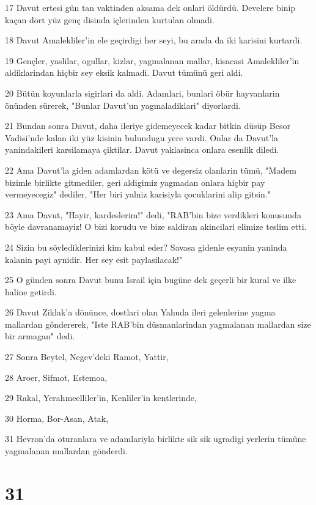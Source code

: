 \par 17 Davut ertesi gün tan vaktinden aksama dek onlari öldürdü. Develere binip kaçan dört yüz genç disinda içlerinden kurtulan olmadi.
\par 18 Davut Amalekliler'in ele geçirdigi her seyi, bu arada da iki karisini kurtardi.
\par 19 Gençler, yaslilar, ogullar, kizlar, yagmalanan mallar, kisacasi Amalekliler'in aldiklarindan hiçbir sey eksik kalmadi. Davut tümünü geri aldi.
\par 20 Bütün koyunlarla sigirlari da aldi. Adamlari, bunlari öbür hayvanlarin önünden sürerek, "Bunlar Davut'un yagmaladiklari" diyorlardi.
\par 21 Bundan sonra Davut, daha ileriye gidemeyecek kadar bitkin düsüp Besor Vadisi'nde kalan iki yüz kisinin bulundugu yere vardi. Onlar da Davut'la yanindakileri karsilamaya çiktilar. Davut yaklasinca onlara esenlik diledi.
\par 22 Ama Davut'la giden adamlardan kötü ve degersiz olanlarin tümü, "Madem bizimle birlikte gitmediler, geri aldigimiz yagmadan onlara hiçbir pay vermeyecegiz" dediler, "Her biri yalniz karisiyla çocuklarini alip gitsin."
\par 23 Ama Davut, "Hayir, kardeslerim!" dedi, "RAB'bin bize verdikleri konusunda böyle davranamayiz! O bizi korudu ve bize saldiran akincilari elimize teslim etti.
\par 24 Sizin bu söylediklerinizi kim kabul eder? Savasa gidenle esyanin yaninda kalanin payi aynidir. Her sey esit paylasilacak!"
\par 25 O günden sonra Davut bunu Israil için bugüne dek geçerli bir kural ve ilke haline getirdi.
\par 26 Davut Ziklak'a dönünce, dostlari olan Yahuda ileri gelenlerine yagma mallardan göndererek, "Iste RAB'bin düsmanlarindan yagmalanan mallardan size bir armagan" dedi.
\par 27 Sonra Beytel, Negev'deki Ramot, Yattir,
\par 28 Aroer, Sifmot, Estemoa,
\par 29 Rakal, Yerahmeelliler'in, Kenliler'in kentlerinde,
\par 30 Horma, Bor-Asan, Atak,
\par 31 Hevron'da oturanlara ve adamlariyla birlikte sik sik ugradigi yerlerin tümüne yagmalanan mallardan gönderdi.

\chapter{31}

